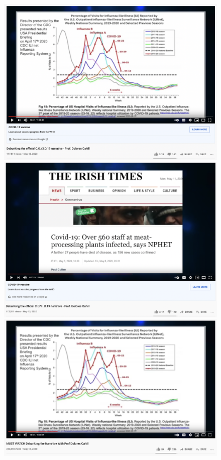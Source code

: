 \documentclass{article}
\begin{document}
\begin{figure}[h]
	\centering
		\includegraphics[scale=0.2]{./img/youtube_panels/graph_with_banner.png} 
		\includegraphics[scale=0.2]{./img/youtube_panels/news_with_banner.png}
		\includegraphics[scale=0.2]{./img/youtube_panels/graph_no_banner.png} 

\end{figure}
\end{document}
